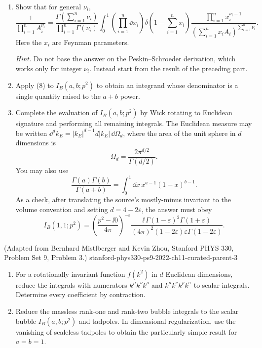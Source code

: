 \begin{enumerate}
\begin{enumerate}
\item
Show that for general \(\nu_i\),
\[
 \frac{1}{\prod_{i=1}^n A_i^{\nu_i}}
 =\frac{\Gamma(\sum_{i=1}^n\nu_i)}
 {\prod_{i=1}^n\Gamma(\nu_i)}
 \int_0^1\!\left(\prod_{i=1}^n \dd x_i\right)
 \delta\!\left(1-\sum_{i=1}^n x_i\right)
 \frac{\prod_{i=1}^n x_i^{\nu_i-1}}
 {(\sum_{i=1}^n x_iA_i)^{\sum_{i=1}^n\nu_i}}.
 \tag{8}
\]
Here the \(x_i\) are Feynman parameters.

\emph{Hint.} Do not base the answer on the Peskin--Schroeder derivation,
which works only for integer \(\nu_i\).  Instead start from the result of
the preceding part.

\item
Apply (8) to \(I_B(a,b;p^2)\) to obtain an integrand whose denominator is a
single quantity raised to the \(a+b\) power.

\item
Complete the evaluation of \(I_B(a,b;p^2)\) by Wick rotating to Euclidean
signature and performing all remaining integrals.  The Euclidean measure
may be written
\(\dd^dk_E=|k_E|^{d-1}d|k_E|\,\dd\Omega_d\), where the area of the unit sphere
in \(d\) dimensions is
\[
 \Omega_d=\frac{2\pi^{d/2}}{\Gamma(d/2)}.
 \tag{9}
\]
You may also use
\[
 \frac{\Gamma(a)\Gamma(b)}{\Gamma(a+b)}
 =\int_0^1\dd x\,x^{a-1}(1-x)^{b-1}.
 \tag{10}
\]
As a check, after translating the source's mostly-minus invariant to the
volume convention and setting \(d=4-2\varepsilon\), the answer must obey
\[
 I_B(1,1;p^2)
 =\left(\frac{p^2-\ii0}{4\pi}\right)^{-\varepsilon}
 \frac{\ii\,\Gamma(1-\varepsilon)^2\Gamma(1+\varepsilon)}
 {(4\pi)^2(1-2\varepsilon)\varepsilon
 \Gamma(1-2\varepsilon)}.
 \tag{11}
\]
\end{enumerate}

  {(Adapted from Bernhard Mistlberger and Kevin Zhou, Stanford PHYS 330, Problem Set 9, Problem 3.)}
  {stanford-phys330-ps9-2022-ch11-curated-parent-3}
\begin{enumerate}
\item
For a rotationally invariant function \(f(k^2)\) in \(d\) Euclidean
dimensions, reduce the integrals with numerators \(k^\mu k^\nu k^\rho\)
and \(k^\mu k^\nu k^\rho k^\sigma\) to scalar integrals.  Determine every
coefficient by contraction.
\item
Reduce the massless rank-one and rank-two bubble integrals to the scalar
bubble \(I_B(a,b;p^2)\) and tadpoles.  In dimensional regularization, use the
vanishing of scaleless tadpoles to obtain the particularly simple result for
\(a=b=1\).
\end{enumerate}


\end{enumerate}
